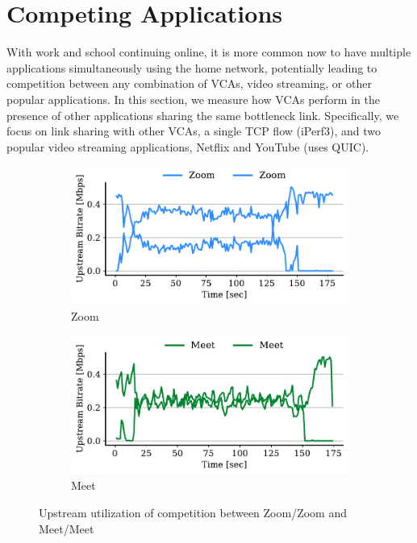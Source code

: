 \section{Competing Applications}
\label{sec:competition}
With work and school continuing online, it is more common now to have multiple applications simultaneously using the home network, potentially leading to competition between any combination of VCAs, video streaming, or other popular applications. In this section, we measure how VCAs perform in the presence of other applications sharing the same bottleneck link. Specifically, we focus on link sharing with other VCAs, a single TCP flow (iPerf3), and two popular video streaming applications, Netflix and YouTube (uses QUIC). 


\begin{figure}[t!]
\centering
\begin{subfigure}[t]{.4\textwidth}
    \centering
    \includegraphics[width=1\textwidth]{figures/comp_ts/zoom_zoom_0.5_ul_r2.pdf}
    \caption{Zoom}
    \label{subfig:zoom_zoom_0_5}
\end{subfigure}\hfill
\begin{subfigure}[t]{.4\textwidth}
    \centering
    \includegraphics[width=1\textwidth]{figures/comp/meet_meet_0.5_ul_r1.pdf}
    \caption{Meet}
    \label{subfig:meet_meet_0_5}
\end{subfigure}
\caption{Upstream utilization of competition between Zoom/Zoom and Meet/Meet}
\label{fig:meet-zoom-upld-0.5}
\end{figure}

